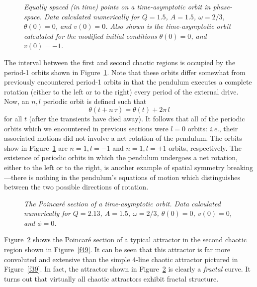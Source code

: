 \begin{figure}
\centerline{}
\caption{\em Equally spaced (in time) points on a time-asymptotic orbit in phase-space. Data 
calculated numerically for $Q=1.5$, $A=1.5$, $\omega=2/3$, $\theta(0)=0$,
and $v(0)=0$.
Also shown is the time-asymptotic orbit calculated for the modified initial
conditions $\theta(0)=0$, and
$v(0)=-1$.}\label{f50}
\end{figure}

The interval
between the first and second chaotic regions is occupied by the period-1 orbits shown in
Figure~\ref{f50}. Note that these orbits differ somewhat  from previously encountered period-1 orbits
 in that the pendulum executes a complete rotation (either to
the left or to the right) every period of the external drive. 
Now, an $n,l$ periodic orbit is defined such that
$$
\theta(t+n\,\tau) = \theta(t) + 2\pi\,l
$$
for all $t$ (after the transients have died away). It follows that all of the periodic orbits which we 
encountered in previous sections were $l=0$ orbits: {\em i.e.}, their  associated motions did
not involve a net rotation of the pendulum. The orbits show in Figure~\ref{f50}
are $n=1, l=-1$ and $n=1, l=+1$ orbits, respectively. The existence of periodic
orbits in which the pendulum undergoes a net rotation, either to the left or to the right,
is another example of spatial symmetry breaking---there is nothing in the pendulum's equations
of motion which distinguishes between the two possible directions of rotation.

\begin{figure}
\epsfysize=3in
\centerline{}
\caption{\em The Poincar\'{e} section of a time-asymptotic orbit. Data
calculated numerically for $Q=2.13$, $A=1.5$, $\omega=2/3$, $\theta(0)=0$,
$v(0)=0$, and $\phi=0$. }\label{f51}
\end{figure}

Figure~\ref{f51} shows the Poincar\'{e} section of a typical  attractor in the
second chaotic region shown in Figure~\ref{f49}. It can be seen that this attractor is far more
convoluted and extensive than the simple 4-line chaotic attractor pictured in Figure~\ref{f39}. 
In fact, the attractor shown in Figure~\ref{f51} is clearly a {\em fractal}\/ curve. It turns
out that virtually all chaotic attractors exhibit fractal structure.

